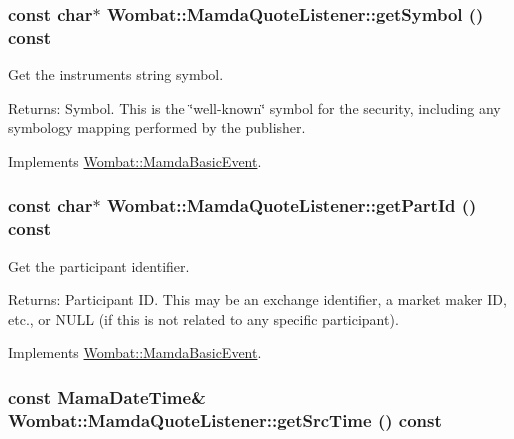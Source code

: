 \hypertarget{classWombat_1_1MamdaQuoteListener_e94788daaae88602911d3b1a5b9ae3aa}{
\subsubsection[getSymbol]{\setlength{\rightskip}{0pt plus 5cm}const char$\ast$ Wombat::Mamda\-Quote\-Listener::get\-Symbol () const}}
\label{classWombat_1_1MamdaQuoteListener_e94788daaae88602911d3b1a5b9ae3aa}


Get the instruments string symbol. 

\begin{Desc}
\item[Returns:]Symbol. This is the \char`\"{}well-known\char`\"{} symbol for the security, including any symbology mapping performed by the publisher. \end{Desc}


Implements \hyperlink{classWombat_1_1MamdaBasicEvent_8783b136a1305d21c578ced8618c090b}{Wombat::Mamda\-Basic\-Event}.\hypertarget{classWombat_1_1MamdaQuoteListener_7d1a662d35580eaf5d03260c977999a6}{
\subsubsection[getPartId]{\setlength{\rightskip}{0pt plus 5cm}const char$\ast$ Wombat::Mamda\-Quote\-Listener::get\-Part\-Id () const}}
\label{classWombat_1_1MamdaQuoteListener_7d1a662d35580eaf5d03260c977999a6}


Get the participant identifier. 

\begin{Desc}
\item[Returns:]Participant ID. This may be an exchange identifier, a market maker ID, etc., or NULL (if this is not related to any specific participant). \end{Desc}


Implements \hyperlink{classWombat_1_1MamdaBasicEvent_94e531c6ae9ae7798725db14facbd6e2}{Wombat::Mamda\-Basic\-Event}.\hypertarget{classWombat_1_1MamdaQuoteListener_3632c2277d9c0a6bf0882f484966f71c}{
\subsubsection[getSrcTime]{\setlength{\rightskip}{0pt plus 5cm}const Mama\-Date\-Time\& Wombat::Mamda\-Quote\-Listener::get\-Src\-Time () const}}
\label{classWombat_1_1MamdaQuoteListener_3632c2277d9c0a6bf0882f484966f71c}


